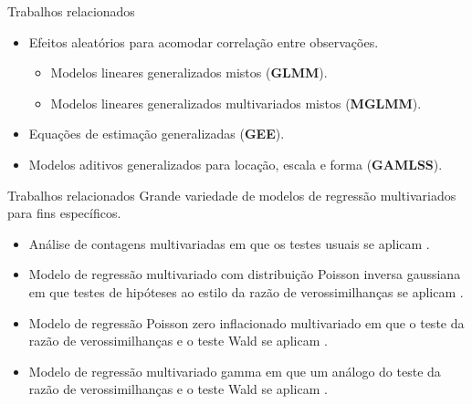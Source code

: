 \documentclass[
  ignorenonframetext,
  serif,
  professionalfont,
  usenames,
  dvipsnames,
  aspectratio = 169]{beamer}
\begin{document}
\begin{frame}{Trabalhos relacionados}
\protect\hypertarget{trabalhos-relacionados-2}{}
\begin{itemize}
  \itemsep 2ex
  
  \item Efeitos aleatórios para acomodar correlação entre observações.
    \begin{itemize}
      \item Modelos lineares generalizados mistos (\textbf{GLMM}).
      \item Modelos lineares generalizados multivariados mistos (\textbf{MGLMM}).
    \end{itemize}

  \item Equações de estimação generalizadas (\textbf{GEE}).

  \item Modelos aditivos generalizados para locação, escala e forma (\textbf{GAMLSS}).
  
\end{itemize}
\end{frame}

\begin{frame}{Trabalhos relacionados}
\protect\hypertarget{trabalhos-relacionados-3}{}
Grande variedade de modelos de regressão multivariados para fins
específicos.

\begin{itemize}
  \itemsep 2ex
  
  \item Análise de contagens multivariadas em que os testes usuais se aplicam \citep{zhang2017regression}.  

  \item Modelo de regressão multivariado com distribuição Poisson inversa gaussiana em que testes de hipóteses ao estilo da razão de verossimilhanças se aplicam \citep{mardalena2020parameter}. 

  \item Modelo de regressão Poisson zero inflacionado multivariado em que o teste da razão de verossimilhanças e o teste Wald se aplicam \citep{sari2021estimation}.
  
  \item Modelo de regressão multivariado gamma em que um análogo do teste da razão de verossimilhanças e o teste Wald se aplicam \citet{rahayu2020multivariate}.

\end{itemize}
\end{frame}
\end{document}
